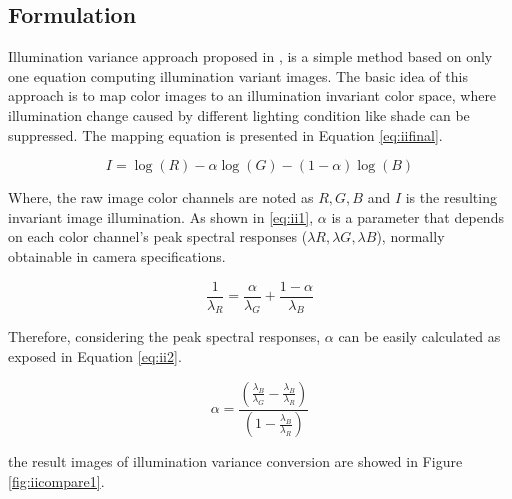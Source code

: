 \subsection{Formulation}
Illumination variance approach proposed in \cite{maddern2014illumination}, is a simple method based on only one equation computing illumination variant images. The basic idea of this approach is to map color images to an illumination invariant color space, where illumination change caused by different lighting condition like shade can be suppressed. The mapping equation
is presented in Equation \ref{eq:iifinal}.

\begin{equation}
I=\log(R)-\alpha\log(G)-(1-\alpha)\log(B)
\label{eq:iifinal}
\end{equation}

Where, the raw image color channels are noted as $R, G, B$ and $I$ is the resulting invariant image illumination. As shown in \ref{eq:ii1}, $\alpha$ is a parameter that depends on each color channel's peak spectral responses ($ \lambda R, \lambda G, \lambda B$), normally obtainable in camera specifications. 

\begin{equation}
\frac{1}{\lambda_R}=\frac{\alpha}{\lambda_G}+\frac{1-\alpha}{\lambda_B}
\label{eq:ii1}
\end{equation}

Therefore, considering the peak spectral responses, $\alpha$ can be easily calculated as exposed in Equation \ref{eq:ii2}.

\begin{equation}
\alpha=\frac{(\frac{\lambda_B}{\lambda_G}-\frac{\lambda_B}{\lambda_R})}{(1-\frac{\lambda_B}{\lambda_R})}
\label{eq:ii2}
\end{equation}

the result images of illumination variance conversion are showed in Figure \ref{fig:iicompare1}.


